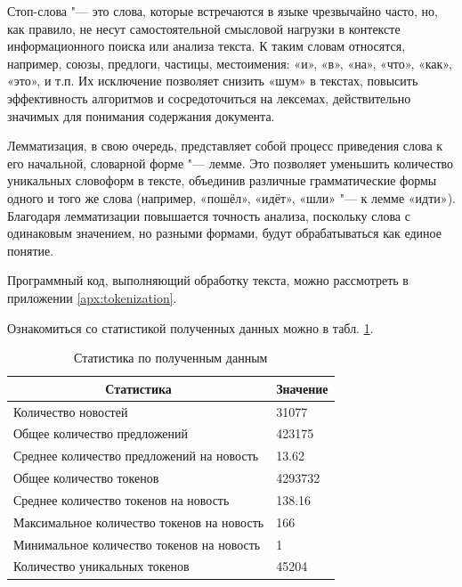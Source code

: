 \documentclass[coursework]{SCWorks}
\begin{document}
Стоп-слова "--- это слова, которые встречаются в языке чрезвычайно часто, но, как правило, не несут самостоятельной смысловой нагрузки в контексте информационного поиска или анализа текста. К таким словам относятся, например, союзы, предлоги, частицы, местоимения: «и», «в», «на», «что», «как», «это», и т.п. Их исключение позволяет снизить «шум» в текстах, повысить эффективность алгоритмов и сосредоточиться на лексемах, действительно значимых для понимания содержания документа.
  
Лемматизация, в свою очередь, представляет собой процесс приведения слова к его начальной, словарной форме "--- лемме. Это позволяет уменьшить количество уникальных словоформ в тексте, объединив различные грамматические формы одного и того же слова (например, «пошёл», «идёт», «шли» "--- к лемме «идти»). Благодаря лемматизации повышается точность анализа, поскольку слова с одинаковым значением, но разными формами, будут обрабатываться как единое понятие.

Программный код, выполняющий обработку текста, можно рассмотреть в приложении \ref{apx:tokenization}.

Ознакомиться со статистикой полученных данных можно в табл. \ref{table:preprocess}.
\begin{table}[!h]
    \centering
    \begin{tabular}{|l|l|}
    \hline
    \multicolumn{1}{|c|}{\textbf{Статистика}}  & \multicolumn{1}{c|}{\textbf{Значение}} \\ \hline
    Количество новостей                        & 31077                                  \\ \hline
    Общее количество предложений               & 423175                                 \\ \hline
    Среднее количество предложений на новость  & 13.62                                  \\ \hline
    Общее количество токенов                   & 4293732                                \\ \hline
    Среднее количество токенов на новость      & 138.16                                 \\ \hline
    Максимальное количество токенов на новость & 166                                    \\ \hline
    Минимальное количество токенов на новость  & 1                                      \\ \hline
    Количество уникальных токенов              & 45204                                  \\ \hline
    \end{tabular} 
    \caption{Статистика по полученным данным}
    \label{table:preprocess}
\end{table}
\end{document}
